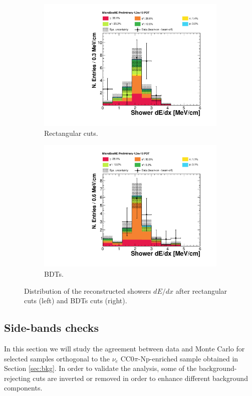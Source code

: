 \begin{figure}[htbp]
\centering
  \begin{subfigure}{0.48\textwidth}
    \includegraphics[width=\linewidth]{figures/dedx_cuts.pdf}
    \caption{Rectangular cuts.} 
  \end{subfigure}
    \begin{subfigure}{0.48\textwidth}
    \includegraphics[width=\linewidth]{figures/dedx_bdt.pdf}
    \caption{BDTs.} 
  \end{subfigure}
  \caption{Distribution of the reconstructed showers $dE/dx$ after rectangular cuts (left) and BDTs cuts (right).}
  \label{fig:dedx_after}
\end{figure}

\subsection{Side-bands checks}
In this section we will study the agreement between data and Monte Carlo for selected samples orthogonal to the $\nu_{e}$ CC0$\pi$-Np-enriched sample obtained in Section \ref{sec:bkg}. In order to validate the analysis, some of the background-rejecting cuts are inverted or removed in order to enhance different background components.
